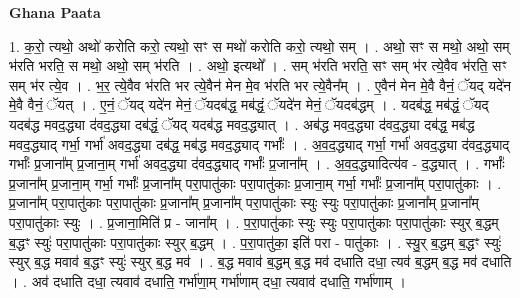\documentclass[17pt]{extarticle}
\begin{document}
\textbf{Ghana Paata } \newline

1. क॒रो॒ त्यथो॒ अथो॑ करोति करो॒ त्यथो॒ सꣳ स मथो॑ करोति करो॒ त्यथो॒ सम् । . अथो॒ सꣳ स मथो॒ अथो॒ सम् भ॑रति भरति॒ स मथो॒ अथो॒ सम् भ॑रति । . अथो॒ इत्यथो᳚ । . सम् भ॑रति भरति॒ सꣳ सम् भ॑र त्ये॒वैव भ॑रति॒ सꣳ सम् भ॑र त्ये॒व । . भ॒र॒ त्ये॒वैव भ॑रति भर त्ये॒वैन॑ मेन मे॒व भ॑रति भर त्ये॒वैन᳚म् । . ए॒वैन॑ मेन मे॒वै वैनं॒ ॅयद् यदे॑न मे॒वै वैनं॒ ॅयत् । . ए॒नं॒ ॅयद् यदे॑न मेनं॒ ॅयदब॑द्ध॒ मब॑द्धं॒ ॅयदे॑न मेनं॒ ॅयदब॑द्धम् । . यदब॑द्ध॒ मब॑द्धं॒ ॅयद् यदब॑द्ध मवद॒द्ध्या द॑वद॒द्ध्या दब॑द्धं॒ ॅयद् यदब॑द्ध मवद॒द्ध्यात् । . अब॑द्ध मवद॒द्ध्या द॑वद॒द्ध्या दब॑द्ध॒ मब॑द्ध मवद॒द्ध्याद् गर्भा॒ गर्भा॑ अवद॒द्ध्या दब॑द्ध॒ मब॑द्ध मवद॒द्ध्याद् गर्भाः᳚ । . अ॒व॒द॒द्ध्याद् गर्भा॒ गर्भा॑ अवद॒द्ध्या द॑वद॒द्ध्याद् गर्भाः᳚ प्र॒जाना᳚म् प्र॒जाना॒म् गर्भा॑ अवद॒द्ध्या द॑वद॒द्ध्याद् गर्भाः᳚ प्र॒जाना᳚म् । . अ॒व॒द॒द्ध्यादित्य॑व - द॒द्ध्यात् । . गर्भाः᳚ प्र॒जाना᳚म् प्र॒जाना॒म् गर्भा॒ गर्भाः᳚ प्र॒जाना᳚म् परा॒पातु॑काः परा॒पातु॑काः प्र॒जाना॒म् गर्भा॒ गर्भाः᳚ प्र॒जाना᳚म् परा॒पातु॑काः । . प्र॒जाना᳚म् परा॒पातु॑काः परा॒पातु॑काः प्र॒जाना᳚म् प्र॒जाना᳚म् परा॒पातु॑काः स्युः स्युः परा॒पातु॑काः प्र॒जाना᳚म् प्र॒जाना᳚म् परा॒पातु॑काः स्युः । . प्र॒जाना॒मिति॑ प्र - जाना᳚म् । . प॒रा॒पातु॑काः स्युः स्युः परा॒पातु॑काः परा॒पातु॑काः स्युर् ब॒द्धम् ब॒द्धꣳ स्युः॑ परा॒पातु॑काः परा॒पातु॑काः स्युर् ब॒द्धम् । . प॒रा॒पातु॑का॒ इति॑ परा - पातु॑काः । . स्यु॒र् ब॒द्धम् ब॒द्धꣳ स्युः॑ स्युर् ब॒द्ध मवाव॑ ब॒द्धꣳ स्युः॑ स्युर् ब॒द्ध मव॑ । . ब॒द्ध मवाव॑ ब॒द्धम् ब॒द्ध मव॑ दधाति दधा॒ त्यव॑ ब॒द्धम् ब॒द्ध मव॑ दधाति । . अव॑ दधाति दधा॒ त्यवाव॑ दधाति॒ गर्भा॑णा॒म् गर्भा॑णाम् दधा॒ त्यवाव॑ दधाति॒ गर्भा॑णाम् । \newline
\end{document}
